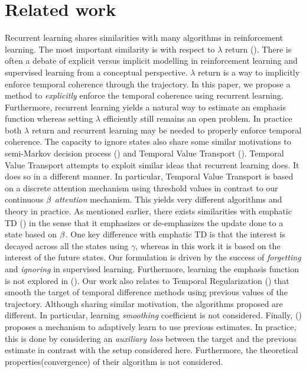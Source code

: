 \section{Related work}
Recurrent learning shares similarities with many algorithms in reinforcement learning. The most important similarity is with respect to $\lambda$ return (\cite{sutton1998reinforcement,dayan1992convergence}). There is often a debate of explicit versus implicit modelling in reinforcement learning and supervised learning from a conceptual perspective. $\lambda$ return is a way to implicitly enforce temporal coherence through the trajectory. In this paper, we propose a method to \emph{explicitly} enforce the temporal coherence using recurrent learning. Furthermore, recurrent learning yields a natural way to estimate an emphasis function whereas setting $\lambda$ efficiently still remains an open problem. In practice both $\lambda$ return and recurrent learning may be needed to properly enforce temporal coherence. The capacity to ignore states also share some similar motivations to semi-Markov decision process (\cite{puterman1990markov}) and Temporal Value Transport (\cite{TVT}). Temporal Value Transport attempts to exploit similar ideas that recurrent learning does. It does so in a different manner. In particular, Temporal Value Transport is based on a discrete attention mechanism using threshold values in contrast to our continuous $\beta$ \emph{attention} mechanism. This yields very different algorithms and theory in practice. As mentioned earlier, there exists similarities with emphatic TD (\cite{mahmood2015emphatic}) in the sense that it emphasizes or de-emphasizes the update done to a state based on $\beta$. One key difference with emphatic TD is that the interest is decayed across all the states using $\gamma$, whereas in this work it is based on the interest of the future states. Our formulation is driven by the success of \emph{forgetting} and \emph{ignoring} in supervised learning. Furthermore, learning the emphasis function is not explored in (\cite{mahmood2015emphatic}). Our work also relates to Temporal Regularization (\cite{thodoroff2018temporal}) that smooth the target of temporal difference methods using previous values of the trajectory. Although sharing similar motivation, the algorithms proposed are different. In particular, learning \emph{smoothing} coefficient is not considered. Finally, (\cite{xu2017natural}) proposes a mechanism to adaptively learn to use previous estimates. In practice, this is done by considering an \emph{auxiliary loss} between the target and the previous estimate in contrast with the setup considered here. Furthermore, the theoretical properties(convergence) of their algorithm is not considered.


